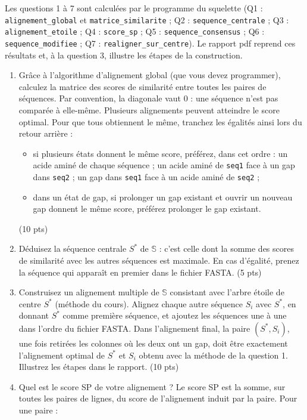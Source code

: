 \documentclass[12pt]{article}
\begin{document}
Les questions 1 à 7 sont calculées par le programme du squelette (Q1 : \texttt{alignement\_global} et \texttt{matrice\_similarite} ; Q2 : \texttt{sequence\_centrale} ; Q3 : \texttt{alignement\_etoile} ; Q4 : \texttt{score\_sp} ; Q5 : \texttt{sequence\_consensus} ; Q6 : \texttt{sequence\_modifiee} ; Q7 : \texttt{realigner\_sur\_centre}). Le rapport pdf reprend ces résultats et, à la question 3, illustre les étapes de la construction.
\begin{enumerate}
	\item Grâce à l'algorithme d'alignement global (que vous devez programmer), calculez la matrice des scores de similarité entre toutes les paires de séquences. Par convention, la diagonale vaut 0 : une séquence n'est pas comparée à elle-même.
	      Plusieurs alignements peuvent atteindre le score optimal. Pour que tous obtiennent le même, tranchez les égalités ainsi lors du retour arrière :
	      \begin{itemize}
		      \item si plusieurs états donnent le même score, préférez, dans cet ordre : un acide aminé de chaque séquence ; un acide aminé de \texttt{seq1} face à un gap dans \texttt{seq2} ; un gap dans \texttt{seq1} face à un acide aminé de \texttt{seq2} ;
		      \item dans un état de gap, si prolonger un gap existant et ouvrir un nouveau gap donnent le même score, préférez prolonger le gap existant.
	      \end{itemize} (10 pts)
	\item Déduisez la séquence centrale $S^*$ de $\mathbb{S}$ : c'est celle dont la somme des scores de similarité avec les autres séquences est maximale. En cas d'égalité, prenez la séquence qui apparaît en premier dans le fichier FASTA. (5 pts)
	\item Construisez un alignement multiple de $\mathbb{S}$ consistant avec l'arbre étoile de centre $S^*$ (méthode du cours). Alignez chaque autre séquence $S_i$ avec $S^*$, en donnant $S^*$ comme première séquence, et ajoutez les séquences une à une dans l'ordre du fichier FASTA. Dans l'alignement final, la paire $(S^*, S_i)$, une fois retirées les colonnes où les deux ont un gap, doit être exactement l'alignement optimal de $S^*$ et $S_i$ obtenu avec la méthode de la question 1. Illustrez les étapes dans le rapport. (10 pts)
	\item Quel est le score SP de votre alignement ? Le score SP est la somme, sur toutes les paires de lignes, du score de l'alignement induit par la paire. Pour une paire :

\end{enumerate}
\end{document}
